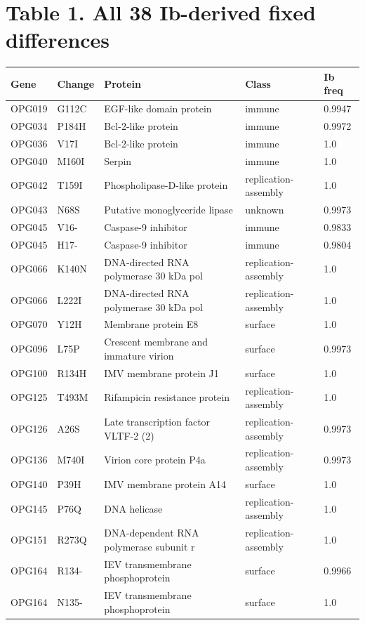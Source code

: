 \documentclass[11pt]{article}
\begin{document}
\section*{Table 1. All 38 Ib-derived fixed differences}
\begin{longtable}{lllll}
\hline Gene & Change & Protein & Class & Ib freq \\ \hline \endhead
OPG019 & G112C & EGF-like domain protein & immune & 0.9947 \\
OPG034 & P184H & Bcl-2-like protein & immune & 0.9972 \\
OPG036 & V17I & Bcl-2-like protein & immune & 1.0 \\
OPG040 & M160I & Serpin & immune & 1.0 \\
OPG042 & T159I & Phospholipase-D-like protein & replication-assembly & 1.0 \\
OPG043 & N68S & Putative monoglyceride lipase & unknown & 0.9973 \\
OPG045 & V16- & Caspase-9 inhibitor & immune & 0.9833 \\
OPG045 & H17- & Caspase-9 inhibitor & immune & 0.9804 \\
OPG066 & K140N & DNA-directed RNA polymerase 30 kDa pol & replication-assembly & 1.0 \\
OPG066 & L222I & DNA-directed RNA polymerase 30 kDa pol & replication-assembly & 1.0 \\
OPG070 & Y12H & Membrane protein E8 & surface & 1.0 \\
OPG096 & L75P & Crescent membrane and immature virion  & surface & 0.9973 \\
OPG100 & R134H & IMV membrane protein J1 & surface & 1.0 \\
OPG125 & T493M & Rifampicin resistance protein & replication-assembly & 1.0 \\
OPG126 & A26S & Late transcription factor VLTF-2 (2) & replication-assembly & 0.9973 \\
OPG136 & M740I & Virion core protein P4a & replication-assembly & 0.9973 \\
OPG140 & P39H & IMV membrane protein A14 & surface & 1.0 \\
OPG145 & P76Q & DNA helicase & replication-assembly & 1.0 \\
OPG151 & R273Q & DNA-dependent RNA polymerase subunit r & replication-assembly & 1.0 \\
OPG164 & R134- & IEV transmembrane phosphoprotein & surface & 0.9966 \\
OPG164 & N135- & IEV transmembrane phosphoprotein & surface & 1.0 \\

\end{longtable}
\end{document}
